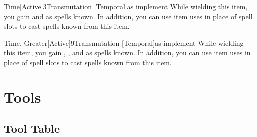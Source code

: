         \begin{magicitemdef}[Arcane]{Time}[Active]{3}{Transmutation [Temporal]}{as implement}
             While wielding this item, you gain  and  as spells known.
            In addition, you can use item uses in place of spell slots to cast spells known from this item.
        \end{magicitemdef}

        \begin{magicitemdef}[Arcane]{Time, Greater}[Active]{9}{Transmutation [Temporal]}{as implement}
             While wielding this item, you gain , , and  as spells known.
            In addition, you can use item uses in place of spell slots to cast spells known from this item.
        \end{magicitemdef}

\section{Tools}

    \onecolumn
    \subsection{Tool Table}

